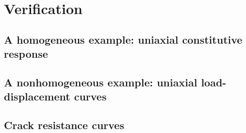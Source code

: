 \section{Verification}
\label{section: ductile/verification}

\subsection{A homogeneous example: uniaxial constitutive response}

\subsection{A nonhomogeneous example: uniaxial load-displacement curves}

\subsection{Crack resistance curves}
